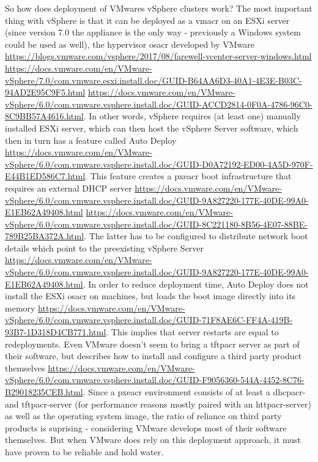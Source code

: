 So how does deployment of VMwares vSphere clusters work? The most important thing with vSphere is that it can be deployed as a \gls{vmacr} on an ESXi server (since version 7.0 the appliance is the only way - previously a Windows system could be used as well), the hypervisor \gls{osacr} developed by VMware \url{https://blogs.vmware.com/vsphere/2017/08/farewell-vcenter-server-windows.html} \url{https://docs.vmware.com/en/VMware-vSphere/7.0/com.vmware.esxi.install.doc/GUID-B64AA6D3-40A1-4E3E-B03C-94AD2E95C9F5.html} \url{https://docs.vmware.com/en/VMware-vSphere/6.0/com.vmware.vsphere.install.doc/GUID-ACCD2814-0F0A-4786-96C0-8C9BB57A4616.html}. In other words, vSphere requires (at least one) manually installed ESXi server, which can then host the vSphere Server software, which then in turn has a feature called Auto Deploy \url{https://docs.vmware.com/en/VMware-vSphere/6.0/com.vmware.vsphere.install.doc/GUID-D0A72192-ED00-4A5D-970F-E44B1ED586C7.html}. This feature creates a \gls{pxeacr} boot infrastructure that requires an external DHCP server \url{https://docs.vmware.com/en/VMware-vSphere/6.0/com.vmware.vsphere.install.doc/GUID-9A827220-177E-40DE-99A0-E1EB62A49408.html} \url{https://docs.vmware.com/en/VMware-vSphere/6.0/com.vmware.vsphere.install.doc/GUID-8C221180-8B56-4E07-88BE-789B25BA372A.html}. The latter has to be configured to distribute network boot details which point to the preexisting vSphere Server \url{https://docs.vmware.com/en/VMware-vSphere/6.0/com.vmware.vsphere.install.doc/GUID-9A827220-177E-40DE-99A0-E1EB62A49408.html}.
In order to reduce deployment time, Auto Deploy does not install the ESXi \gls{osacr} on machines, but loads the boot image directly into its memory \url{https://docs.vmware.com/en/VMware-vSphere/6.0/com.vmware.vsphere.install.doc/GUID-71F8AE6C-FF4A-419B-93B7-1D318D4CB771.html}. This implies that server restarts are equal to redeployments.
\newline
Even VMware doesn't seem to bring a \gls{tftpacr} server as part of their software, but describes how to install and configure a third party product themselves \url{https://docs.vmware.com/en/VMware-vSphere/6.0/com.vmware.vsphere.install.doc/GUID-F9056360-544A-4452-8C76-B29018235CEB.html}. Since a \gls{pxeacr} environment consists of at least a \gls{dhcpacr}- and \gls{tftpacr}-server (for performance reasons mostly paired with an \gls{httpacr}-server) as well as the operating system image, the ratio of reliance on third party products is suprising - considering VMware develops most of their software themselves. But when VMware does rely on this deployment approach, it must have proven to be reliable and hold water. %
